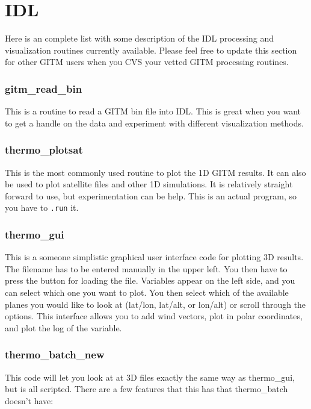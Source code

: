 \section{IDL}
\label{idl.sec}

Here is an complete list with some description of the IDL processing and visualization routines currently available.  Please feel free to update this section for other GITM users when you CVS your vetted GITM processing routines.
 
\subsubsection{gitm\_read\_bin}

This is a routine to read a GITM bin file into IDL.  This is great when you want to get a handle on the data and experiment with different visualization methods.

\subsubsection{thermo\_plotsat}

This is the most commonly used routine to plot the 1D GITM results.  It can also be used to plot satellite files and other 1D simulations.  It is relatively straight forward to use, but experimentation can be help.  This is an actual program, so you have to {\tt .run} it.

\subsubsection{thermo\_gui}

This is a someone simplistic graphical user interface code for plotting 3D results.  The filename has to be entered manually in the upper left.  You then have to press the button for loading the file.  Variables appear on the left side, and you can select which one you want to plot.  You then select which of the available planes you would like to look at (lat/lon, lat/alt, or lon/alt) or scroll through the options.  This interface allows you to add wind vectors, plot in polar coordinates, and plot the log of the variable.

\subsubsection{thermo\_batch\_new}

This code will let you look at at 3D files exactly the same way as thermo\_gui, but is all scripted.  There are a few features that this has that thermo\_batch doesn't have:

